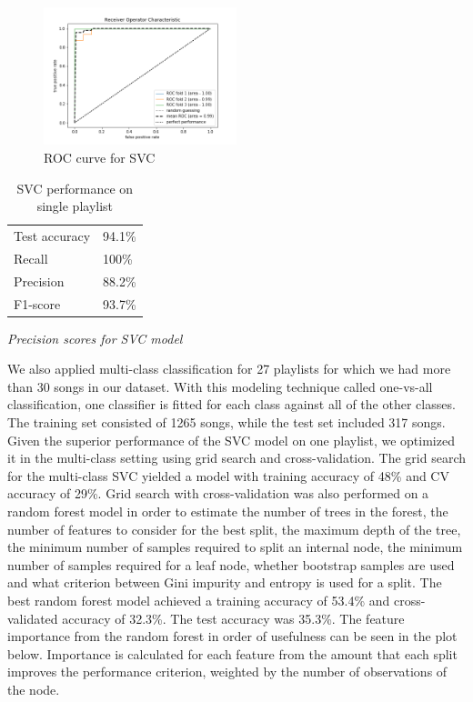 \documentclass[acmtog]{acmart}
\begin{document}
\begin{figure}[h]
  \includegraphics[width=0.5\textwidth]{ROC_curve}
  \caption{ROC curve for SVC}
  \label{fig:ROC_curve}
\end{figure}

\newpage
\begin{table}%
\caption{SVC performance on single playlist}
\label{tab:one}
\begin{minipage}{\columnwidth}
\begin{center}
\begin{tabular}{ll}
  \toprule
  Test accuracy    & 94.1\%\\
  Recall  & 100\%\\
  Precision    & 88.2\%\\
  F1-score    & 93.7\%\\
  \bottomrule
\end{tabular}
\end{center}
\bigskip\centering
\footnotesize
 \emph{Precision scores for SVC model}
\end{minipage}
\end{table}%
\newpage
We also applied multi-class classification for 27 playlists for which we had more than 30 songs in our dataset. With this modeling technique called one-vs-all classification, one classifier is fitted for each class against all of the other classes. The training set consisted of 1265 songs, while the test set included 317 songs. Given the superior performance of the SVC model on one playlist, we optimized it in the multi-class setting using grid search and cross-validation. The grid search for the multi-class SVC yielded a model with training accuracy of 48\% and CV accuracy of 29\%. Grid search with cross-validation was also performed on a random forest model in order to estimate the number of trees in the forest, the number of features to consider for the best split, the maximum depth of the tree, the minimum number of samples required to split an internal node, the minimum number of samples required for a leaf node, whether bootstrap samples are used and what criterion between Gini impurity and entropy is used for a split. The best random forest model achieved a training accuracy of 53.4\% and cross-validated accuracy of 32.3\%. The test accuracy was 35.3\%. The feature importance from the random forest in order of usefulness can be seen in the plot below. Importance is calculated for each feature from the amount that each split improves the performance criterion, weighted by the number of observations of the node. 
\end{document}
